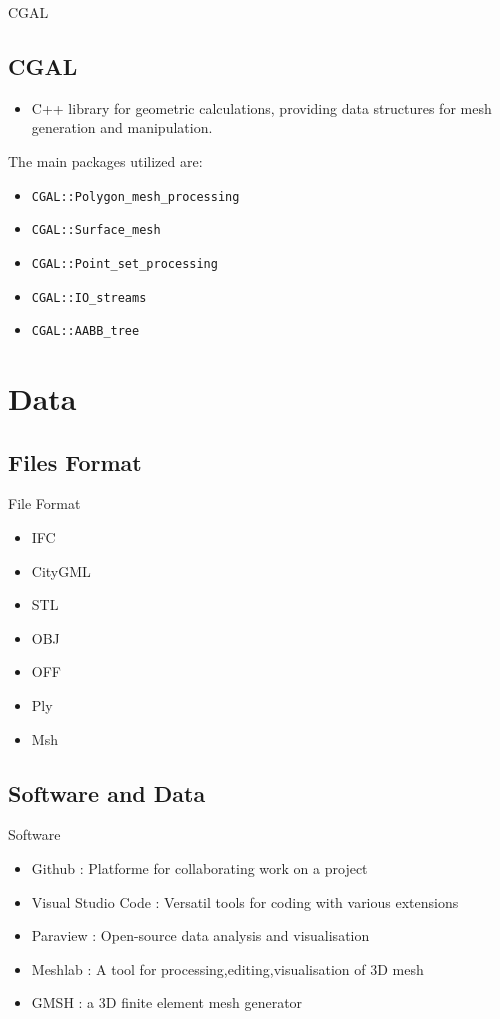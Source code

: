 \documentclass[10pt]{beamer}
\begin{document}
\begin{frame}{CGAL}
    \subsection{CGAL}
    \begin{itemize}
        \item C++ library for geometric calculations, providing data structures for mesh generation and manipulation.
    \end{itemize}
    \vspace{0.5cm}
    The main packages utilized are:
    \begin{itemize}
        \item \texttt{CGAL::Polygon\_mesh\_processing}
        \item \texttt{CGAL::Surface\_mesh}
        \item \texttt{CGAL::Point\_set\_processing}
        \item \texttt{CGAL::IO\_streams}
        \item \texttt{CGAL::AABB\_tree}
    \end{itemize}
    
\end{frame}


\section{Data}
\subsection{Files Format}
\begin{frame}{File Format}
\begin{itemize}
    \item IFC 
    \item CityGML
    \item STL 
    \item OBJ
    \item OFF
    \item Ply
    \item Msh
\end{itemize}
\end{frame}

\subsection{Software and Data}
\begin{frame}{Software}
    \begin{itemize}
        \item Github : Platforme for collaborating work on a project
        \item Visual Studio Code : Versatil tools for coding with various extensions
        \item Paraview : Open-source data analysis and visualisation
        \item Meshlab : A tool for processing,editing,visualisation of 3D mesh
        \item GMSH : a 3D finite element mesh generator
    \end{itemize}

\end{frame}
\end{document}
